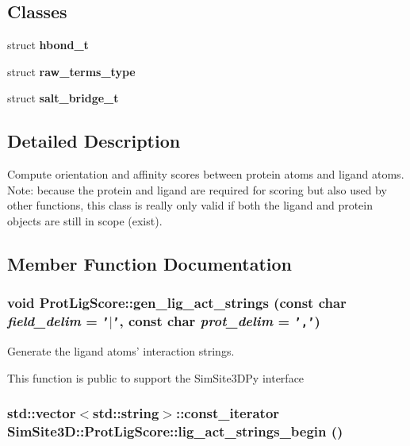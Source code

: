 \subsection*{Classes}
\begin{CompactItemize}
\item 
struct \textbf{hbond\_\-t}
\item 
struct \textbf{raw\_\-terms\_\-type}
\item 
struct \textbf{salt\_\-bridge\_\-t}
\end{CompactItemize}


\subsection{Detailed Description}
Compute orientation and affinity scores between protein atoms and ligand atoms. Note: because the protein and ligand are required for scoring but also used by other functions, this class is really only valid if both the ligand and protein objects are still in scope (exist). 



\subsection{Member Function Documentation}
\subsubsection{\setlength{\rightskip}{0pt plus 5cm}void Prot\-Lig\-Score::gen\_\-lig\_\-act\_\-strings (const char {\em field\_\-delim} = {\tt '$|$'}, const char {\em prot\_\-delim} = {\tt ','})}\label{classSimSite3D_1_1ProtLigScore_f89729aba4e721e341a91e795438a129}


Generate the ligand atoms' interaction strings. 

This function is public to support the SimSite3D\-Py interface 
\subsubsection{\setlength{\rightskip}{0pt plus 5cm}std::vector$<$std::string$>$::const\_\-iterator SimSite3D::Prot\-Lig\-Score::lig\_\-act\_\-strings\_\-begin ()\hspace{0.3cm}{\tt  [inline]}}\label{classSimSite3D_1_1ProtLigScore_8b4e7de39e5853938e31039394322b4f}


